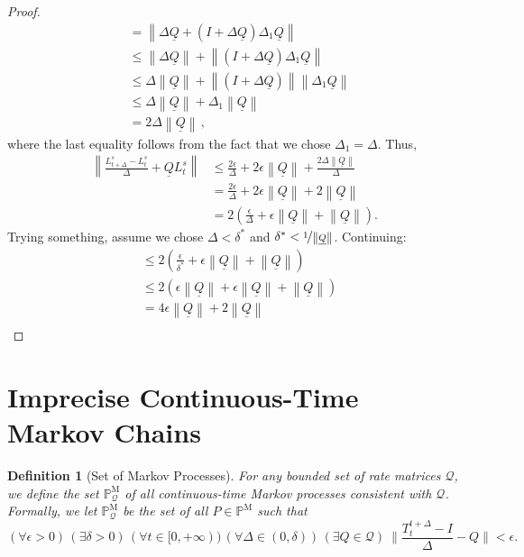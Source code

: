 \documentclass[10pt]{paper}
\newtheorem{definition}{Definition}
\newcommand{\processes}{\mathbb{P}}
\newcommand{\mprocesses}{\processes^{\mathrm{M}}}
\newcommand{\rateset}{\mathcal{Q}}
\newcommand{\lrate}{\underline{Q}}
\newcommand{\norm}[1]{\left\lVert #1 \right\rVert}
\begin{document}
\begin{proof}
\begin{align*}
 &= \norm{\Delta\lrate + \left(I + \Delta\lrate\right)\Delta_1\lrate} \\
 &\leq \norm{\Delta\lrate} + \norm{\left(I + \Delta\lrate\right)\Delta_1\lrate} \\
 &\leq \Delta\norm{\lrate} + \norm{\left(I + \Delta\lrate\right)}\norm{\Delta_1\lrate} \\
 &\leq \Delta\norm{\lrate} + \Delta_1\norm{\lrate} \\
 &= 2\Delta\norm{\lrate}\,,
\end{align*}
where the last equality follows from the fact that we chose $\Delta_1=\Delta$. Thus,
\begin{align*}
\norm{\frac{L_{t+\Delta}^s - L_t^s}{\Delta} + \lrate L_t^s} &\leq \frac{2\epsilon}{\Delta} + 2\epsilon\norm{\lrate} + \frac{2\Delta\norm{\lrate}}{\Delta} \\
 &= \frac{2\epsilon}{\Delta} + 2\epsilon\norm{\lrate} + 2\norm{\lrate} \\
 &= 2\left(\frac{\epsilon}{\Delta} + \epsilon\norm{\lrate} + \norm{\lrate}\right).
\end{align*}
Trying something, assume we chose $\Delta < \delta^*$ and $\delta^*<\nicefrac{1}{\norm{\lrate}}$. Continuing:
\begin{align*}
 &\leq 2\left(\frac{\epsilon}{\delta^*} + \epsilon\norm{\lrate} + \norm{\lrate}\right) \\
 &\leq 2\left(\epsilon\norm{\lrate} + \epsilon\norm{\lrate} + \norm{\lrate}\right) \\
 &= 4\epsilon\norm{\lrate} + 2\norm{\lrate} \\
\end{align*}
\end{proof}

\section{Imprecise Continuous-Time Markov Chains}\label{sec:imp_markov}

\begin{definition}[Set of Markov Processes]\label{def:markov_process_set}
For any bounded set of rate matrices $\rateset$, we define the set $\mprocesses_{\rateset}$ of all continuous-time Markov processes \emph{consistent} with $\rateset$. Formally, we let $\mprocesses_{\rateset}$ be the set of all $P\in\mprocesses$ such that
\begin{equation}\label{eq:conditionforMarkov}
(\forall\epsilon>0)\,
(\exists\delta>0)\,
(\forall t\in[0,+\infty))\,
(\forall\Delta\in(0,\delta))\,
(\exists Q\in\rateset)~
\Big\lVert\frac{T_t^{t+\Delta}-I}{\Delta}-Q\Big\rVert<\epsilon.
\end{equation}
\end{definition}
\end{document}
